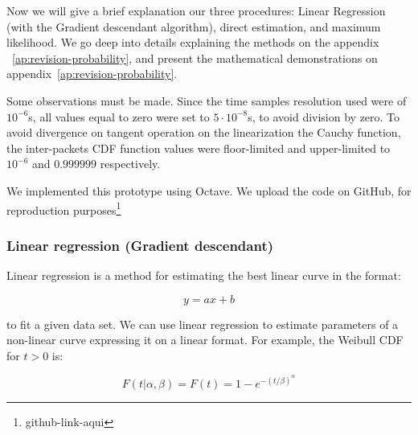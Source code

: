 
Now we will give a brief explanation our three procedures: Linear Regression (with the  Gradient descendant algorithm), direct estimation, and maximum likelihood. We go deep into details explaining the methods on the appendix ~\ref{ap:revision-probability}, and present the mathematical demonstrations on appendix~\ref{ap:revision-probability}. 

Some observations must be made. Since the time samples resolution used were of $10^{-6}$s, all values equal to zero were set to  $5\cdot10^{-8}$s, to avoid division by zero. To avoid divergence on tangent operation on the linearization the Cauchy function, the inter-packets CDF function values were floor-limited and upper-limited to  $10^{-6}$ and $0.999999$ respectively.

We implemented this prototype using Octave. We upload the code on GitHub, for reproduction purposes\footnote{github-link-aqui}

\subsubsection{Linear regression (Gradient descendant)}

Linear regression is a method for estimating the best linear curve in the format:

\begin{equation}
y = ax + b
\end{equation}

to fit a given data set. We can use linear regression to estimate parameters of a non-linear curve expressing it on a linear format. For example, the Weibull CDF for $t > 0$ is:

\begin{equation}
F(t|\alpha, \beta) = F(t) = 1 - e^{-(t/\beta)^{\alpha}}
\end{equation}

